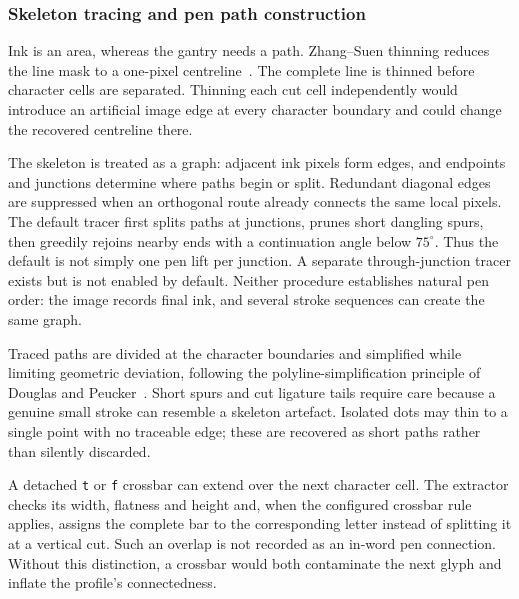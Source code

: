 \subsubsection{Skeleton tracing and pen path construction}
Ink is an area, whereas the gantry needs a path. Zhang--Suen thinning reduces the line mask to a one-pixel centreline~\cite[p.~237]{zhang1984}. The complete line is thinned before character cells are separated. Thinning each cut cell independently would introduce an artificial image edge at every character boundary and could change the recovered centreline there.

The skeleton is treated as a graph: adjacent ink pixels form edges, and endpoints and junctions determine where paths begin or split. Redundant diagonal edges are suppressed when an orthogonal route already connects the same local pixels. The default tracer first splits paths at junctions, prunes short dangling spurs, then greedily rejoins nearby ends with a continuation angle below $75^\circ$. Thus the default is not simply one pen lift per junction. A separate through-junction tracer exists but is not enabled by default. Neither procedure establishes natural pen order: the image records final ink, and several stroke sequences can create the same graph.

Traced paths are divided at the character boundaries and simplified while limiting geometric deviation, following the polyline-simplification principle of Douglas and Peucker~\cite{douglas1973}. Short spurs and cut ligature tails require care because a genuine small stroke can resemble a skeleton artefact. Isolated dots may thin to a single point with no traceable edge; these are recovered as short paths rather than silently discarded.

A detached \texttt{t} or \texttt{f} crossbar can extend over the next character cell. The extractor checks its width, flatness and height and, when the configured crossbar rule applies, assigns the complete bar to the corresponding letter instead of splitting it at a vertical cut. Such an overlap is not recorded as an in-word pen connection. Without this distinction, a crossbar would both contaminate the next glyph and inflate the profile's connectedness.

